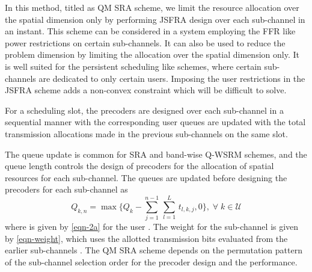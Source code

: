 
In this method, titled as \acf{QM} \ac{SRA} scheme, we limit the resource allocation over the spatial dimension only by performing \ac{JSFRA} design over each sub-channel in an instant. This scheme can be considered in a system employing the \ac{FFR} like power restrictions on certain sub-channels. It can also be used to reduce the problem dimension by limiting the allocation over the spatial dimension only. It is well suited for the persistent scheduling like schemes, where certain sub-channels are dedicated to only certain users. Imposing the user restrictions in the \ac{JSFRA} scheme adds a non-convex constraint which will be difficult to solve. 

For a scheduling slot, the precoders are designed over each sub-channel in a sequential manner with the corresponding user queues are updated with the total transmission allocations made in the previous sub-channels on the same slot.

The queue update is common for \ac{SRA} and band-wise \ac{Q-WSRM} schemes, and the queue length controls the design of precoders for the allocation of spatial resources for each sub-channel. The queues are updated before designing the precoders for each sub-channel  as
\begin{equation}
Q_{k,n} = \max{\Big \lbrace Q_k - \sum_{j = 1}^{n-1} \, \sum_{l = 1}^{L} \, t_{l,k,j} ,0 \Big \rbrace }, \; \forall \; k \in \mathcal{U}
\label{eqn-weight}
\end{equation}
where  is given by \eqref{eqn-2a} for the user . The weight for the sub-channel  is given by \eqref{eqn-weight}, which uses the allotted transmission bits  evaluated from the earlier sub-channels . The \ac{QM} \ac{SRA} scheme depends on the permutation pattern of the sub-channel selection order for the precoder design and the performance.
